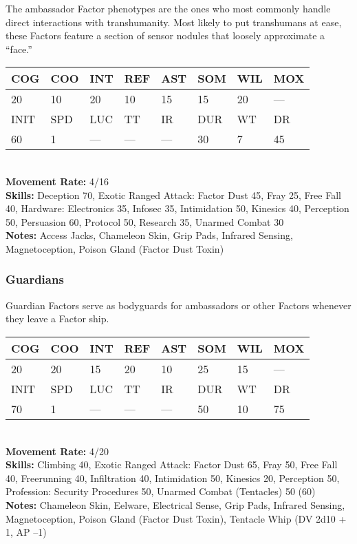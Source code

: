  The ambassador Factor phenotypes are the ones who most commonly handle direct interactions with transhumanity. Most likely to put transhumans at ease, these Factors feature a section of sensor nodules that loosely approximate a ``face.'' \\ \begin{tabular}{|l|l|l|l|l|l|l|l|} \hline

COG &COO &INT &REF &AST &SOM &WIL &MOX \\ \hline

20 &10 &20 &10 &15 &15 &20 &— \\ \hline

INIT &SPD &LUC &TT &IR &DUR &WT &DR \\ \hline

60 &1 &— &— &— &30 &7 &45 \\ \hline

\end{tabular} \\ \textbf{Movement Rate: }4/16 \\ \textbf{Skills:} Deception 70, Exotic Ranged Attack: Factor Dust 45, Fray 25, Free Fall 40, Hardware: Electronics 35, Infosec 35, Intimidation 50, Kinesics 40, Perception 50, Persuasion 60, Protocol 50, Research 35, Unarmed Combat 30 \\ \textbf{Notes: }Access Jacks, Chameleon Skin, Grip Pads, Infrared Sensing, Magnetoception, Poison Gland (Factor Dust Toxin) 



\subsubsection{Guardians} 

Guardian Factors serve as bodyguards for ambassadors or other Factors whenever they leave a Factor ship. \\ \begin{tabular}{|l|l|l|l|l|l|l|l|} \hline

COG &COO &INT &REF &AST &SOM &WIL &MOX \\ \hline

20 &20 &15 &20 &10 &25 &15 &— \\ \hline

INIT &SPD &LUC &TT &IR &DUR &WT &DR \\ \hline

70 &1 &— &— &— &50 &10 &75 \\ \hline

\end{tabular} \\ \textbf{Movement Rate: }4/20 \\ \textbf{Skills:} Climbing 40, Exotic Ranged Attack: Factor Dust 65, Fray 50, Free Fall 40, Freerunning 40, Infiltration 40, Intimidation 50, Kinesics 20, Perception 50, Profession: Security Procedures 50, Unarmed Combat (Tentacles) 50 (60) \\ \textbf{Notes:} Chameleon Skin, Eelware, Electrical Sense, Grip Pads, Infrared Sensing, Magnetoception, Poison Gland (Factor Dust Toxin), Tentacle Whip (DV 2d10 + 1, AP –1) 



